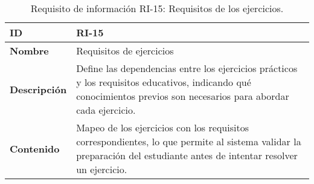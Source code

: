 \begin{table}[H]
    \centering
    \begin{tabular}{|l|p{9.5cm}|}
        \hline
        \textbf{ID} & RI-15 \\
        \hline
        \textbf{Nombre} & Requisitos de ejercicios\\
        \hline
        \textbf{Descripción} & Define las dependencias entre los ejercicios prácticos y los requisitos educativos, indicando qué conocimientos previos son necesarios para abordar cada ejercicio.  \\
        \hline
        \textbf{Contenido} & Mapeo de los ejercicios con los requisitos correspondientes, lo que permite al sistema validar la preparación del estudiante antes de intentar resolver un ejercicio. \\
        \hline
    \end{tabular}
    \caption{Requisito de información RI-15: Requisitos de los ejercicios.}
    \label{table:req-RI17}
\end{table}